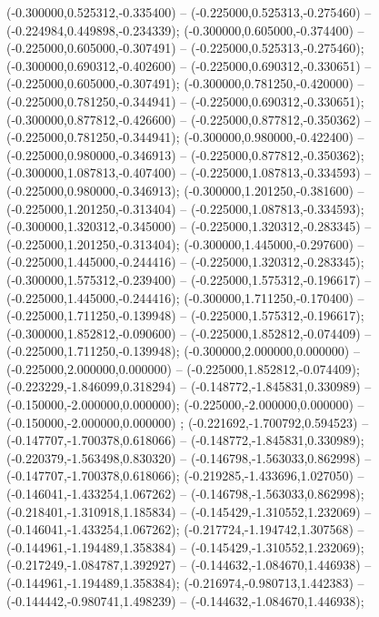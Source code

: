  (-0.300000,0.525312,-0.335400) -- (-0.225000,0.525313,-0.275460) -- (-0.224984,0.449898,-0.234339);
 (-0.300000,0.605000,-0.374400) -- (-0.225000,0.605000,-0.307491) -- (-0.225000,0.525313,-0.275460);
 (-0.300000,0.690312,-0.402600) -- (-0.225000,0.690312,-0.330651) -- (-0.225000,0.605000,-0.307491);
 (-0.300000,0.781250,-0.420000) -- (-0.225000,0.781250,-0.344941) -- (-0.225000,0.690312,-0.330651);
 (-0.300000,0.877812,-0.426600) -- (-0.225000,0.877812,-0.350362) -- (-0.225000,0.781250,-0.344941);
 (-0.300000,0.980000,-0.422400) -- (-0.225000,0.980000,-0.346913) -- (-0.225000,0.877812,-0.350362);
 (-0.300000,1.087813,-0.407400) -- (-0.225000,1.087813,-0.334593) -- (-0.225000,0.980000,-0.346913);
 (-0.300000,1.201250,-0.381600) -- (-0.225000,1.201250,-0.313404) -- (-0.225000,1.087813,-0.334593);
 (-0.300000,1.320312,-0.345000) -- (-0.225000,1.320312,-0.283345) -- (-0.225000,1.201250,-0.313404);
 (-0.300000,1.445000,-0.297600) -- (-0.225000,1.445000,-0.244416) -- (-0.225000,1.320312,-0.283345);
 (-0.300000,1.575312,-0.239400) -- (-0.225000,1.575312,-0.196617) -- (-0.225000,1.445000,-0.244416);
 (-0.300000,1.711250,-0.170400) -- (-0.225000,1.711250,-0.139948) -- (-0.225000,1.575312,-0.196617);
 (-0.300000,1.852812,-0.090600) -- (-0.225000,1.852812,-0.074409) -- (-0.225000,1.711250,-0.139948);
 (-0.300000,2.000000,0.000000) -- (-0.225000,2.000000,0.000000) -- (-0.225000,1.852812,-0.074409);
 (-0.223229,-1.846099,0.318294) -- (-0.148772,-1.845831,0.330989) -- (-0.150000,-2.000000,0.000000);
 (-0.225000,-2.000000,0.000000) -- (-0.150000,-2.000000,0.000000) ;
 (-0.221692,-1.700792,0.594523) -- (-0.147707,-1.700378,0.618066) -- (-0.148772,-1.845831,0.330989);
 (-0.220379,-1.563498,0.830320) -- (-0.146798,-1.563033,0.862998) -- (-0.147707,-1.700378,0.618066);
 (-0.219285,-1.433696,1.027050) -- (-0.146041,-1.433254,1.067262) -- (-0.146798,-1.563033,0.862998);
 (-0.218401,-1.310918,1.185834) -- (-0.145429,-1.310552,1.232069) -- (-0.146041,-1.433254,1.067262);
 (-0.217724,-1.194742,1.307568) -- (-0.144961,-1.194489,1.358384) -- (-0.145429,-1.310552,1.232069);
 (-0.217249,-1.084787,1.392927) -- (-0.144632,-1.084670,1.446938) -- (-0.144961,-1.194489,1.358384);
 (-0.216974,-0.980713,1.442383) -- (-0.144442,-0.980741,1.498239) -- (-0.144632,-1.084670,1.446938);
